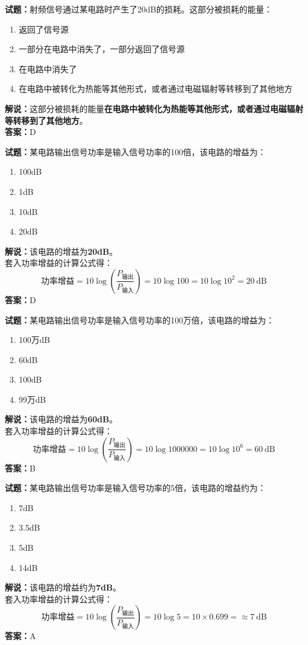 \documentclass{ctexbook}
\begin{document}
\bigskip


\noindent\textbf{试题：}射频信号通过某电路时产生了20dB的损耗。这部分被损耗的能量：
\begin{enumerate}[leftmargin=3em]
\item 返回了信号源
\item 一部分在电路中消失了，一部分返回了信号源
\item 在电路中消失了
\item 在电路中被转化为热能等其他形式，或者通过电磁辐射等转移到了其他地方
\end{enumerate}
\noindent\textbf{解说：}这部分被损耗的能量\textbf{在电路中被转化为热能等其他形式，或者通过电磁辐射等转移到了其他地方}。\\\noindent\textbf{答案：}D



\bigskip


\noindent\textbf{试题：}某电路输出信号功率是输入信号功率的100倍，该电路的增益为：
\begin{enumerate}[leftmargin=3em]
\item 100dB
\item 1dB
\item 10dB
\item 20dB
\end{enumerate}
\noindent\textbf{解说：}该电路的增益为\textbf{20dB}。\\
套入功率增益的计算公式得：
$$\mbox{功率增益}=10 \log \left( {\frac{P_{ \mbox{输出} }}{P_{ \mbox{输入} }}} \right)=10 \log 100 = 10 \log 10^2 = 20 \ \mathrm{dB}$$
\noindent\textbf{答案：}D



\bigskip


\noindent\textbf{试题：}某电路输出信号功率是输入信号功率的100万倍，该电路的增益为：
\begin{enumerate}[leftmargin=3em]
\item 100万dB
\item 60dB
\item 100dB
\item 99万dB
\end{enumerate}
\noindent\textbf{解说：}该电路的增益为\textbf{60dB}。\\
套入功率增益的计算公式得：
$$\mbox{功率增益}=10 \log \left( {\frac{P_{ \mbox{输出} }}{P_{ \mbox{输入} }}} \right)=10 \log 1000000 = 10 \log 10^6 = 60 \ \mathrm{dB}$$
\noindent\textbf{答案：}B




\bigskip


\noindent\textbf{试题：}某电路输出信号功率是输入信号功率的5倍，该电路的增益约为：
\begin{enumerate}[leftmargin=3em]
\item 7dB
\item 3.5dB
\item 5dB
\item 14dB
\end{enumerate}
\noindent\textbf{解说：}该电路的增益约为\textbf{7dB}。\\
套入功率增益的计算公式得：
$$\mbox{功率增益}=10 \log \left( {\frac{P_{ \mbox{输出} }}{P_{ \mbox{输入} }}} \right)=10 \log 5 = 10 \times 0.699 = \approx 7 \ \mathrm{dB}$$
\noindent\textbf{答案：}A
\end{document}
